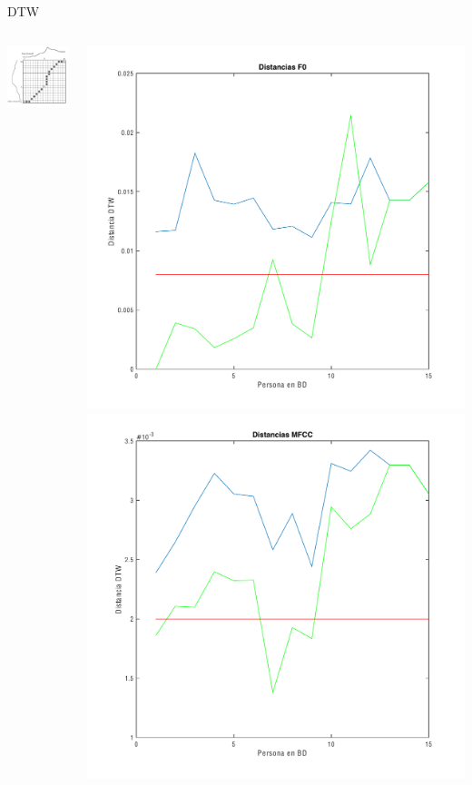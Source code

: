 \documentclass{beamer}
\begin{document}
\begin{frame}{DTW}

\begin{columns}
\begin{column}{0.5\linewidth}
\begin{center}
\includegraphics[width=0.7\linewidth]{27}
\end{center}
\end{column}
\begin{column}{0.5\linewidth}
\begin{center}
\includegraphics[width=0.7\linewidth]{dF0} \hfill
\includegraphics[width=0.7\linewidth]{dMFCC}
\end{center}
\end{column}


\end{columns}
\end{frame}
\end{document}
